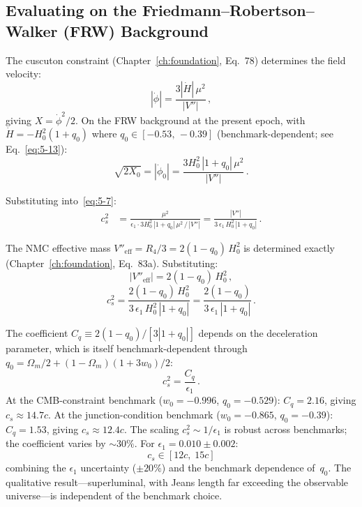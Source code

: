 \subsection{Evaluating on the Friedmann--Robertson--Walker (FRW) Background}
\label{sec:5-frw}

The cuscuton constraint (Chapter~\ref{ch:foundation}, Eq.~78) determines the field velocity:
\begin{equation}
  |\dot{\phi}| = \frac{3|\dot{H}|\,\mu^2}{|V''|}\,,
  \label{eq:5-8}
\end{equation}
giving $X = \dot{\phi}^2/2$. On the FRW background at the present epoch, with $\dot{H} = -H_0^2(1+q_0)$ where $q_0 \in [-0.53,\, -0.39]$ (benchmark-dependent; see Eq.~\eqref{eq:5-13}):
\begin{equation}
  \sqrt{2X_0} = |\dot{\phi}_0|
              = \frac{3H_0^2\,|1+q_0|\,\mu^2}{|V''|}\,.
  \label{eq:5-9}
\end{equation}

Substituting into~\eqref{eq:5-7}:
\begin{align}
  c_s^2 &= \frac{\mu^2}{\epsilon_1 \cdot 3H_0^2\,|1+q_0|\,\mu^2\,/\,|V''|}
         = \frac{|V''|}{3\,\epsilon_1\,H_0^2\,|1+q_0|}\,.
  \label{eq:5-10}
\end{align}

The NMC effective mass $V''_\mathrm{eff} = R_4/3 = 2(1-q_0)\,H_0^2$ is determined exactly (Chapter~\ref{ch:foundation}, Eq.~83a). Substituting:
\begin{equation}
  |V''_\mathrm{eff}| = 2(1 - q_0)\,H_0^2\,,
  \label{eq:5-11}
\end{equation}
\begin{equation}
  c_s^2 = \frac{2(1-q_0)\,H_0^2}{3\,\epsilon_1\,H_0^2\,|1+q_0|}
        = \frac{2(1-q_0)}{3\,\epsilon_1\,|1+q_0|}\,.
  \label{eq:5-12}
\end{equation}

The coefficient $C_q \equiv 2(1-q_0)/[3|1+q_0|]$ depends on the deceleration parameter, which is itself benchmark-dependent through $q_0 = \Omega_m/2 + (1-\Omega_m)(1+3w_0)/2$:
\begin{equation}
  c_s^2 = \frac{C_q}{\epsilon_1}\,.
  \label{eq:5-13}
\end{equation}
At the CMB-constraint benchmark ($w_0 = -0.996$, $q_0 = -0.529$): $C_q = 2.16$, giving $c_s \approx 14.7c$. At the junction-condition benchmark ($w_0 = -0.865$, $q_0 = -0.39$): $C_q = 1.53$, giving $c_s \approx 12.4c$. The scaling $c_s^2 \sim 1/\epsilon_1$ is robust across benchmarks; the coefficient varies by $\sim 30\%$. For $\epsilon_1 = 0.010 \pm 0.002$:
\begin{equation}
  \boxed{c_s \in [12c,\; 15c]}
  \label{eq:5-14}
\end{equation}
combining the $\epsilon_1$ uncertainty ($\pm 20\%$) and the benchmark dependence of~$q_0$. The qualitative result---superluminal, with Jeans length far exceeding the observable universe---is independent of the benchmark choice.

